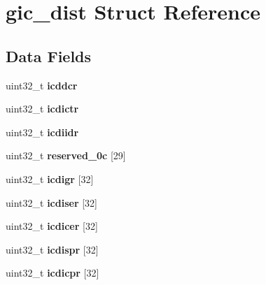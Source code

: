 \hypertarget{structgic__dist}{}\section{gic\+\_\+dist Struct Reference}
\label{structgic__dist}
\subsection*{Data Fields}
\begin{DoxyCompactItemize}
\item 
\mbox{\label{structgic__dist_acb869ca90c086871cbdedb86af8e6c33}} 
uint32\+\_\+t {\bfseries icddcr}
\item 
\mbox{\label{structgic__dist_aafbd2067aaa487d5c2d7db95680bd8d3}} 
uint32\+\_\+t {\bfseries icdictr}
\item 
\mbox{\label{structgic__dist_a22ebc84cf4b8ed04eecafeba3bb64900}} 
uint32\+\_\+t {\bfseries icdiidr}
\item 
\mbox{\label{structgic__dist_afa932d26fc72f80b8e236525715565db}} 
uint32\+\_\+t {\bfseries reserved\+\_\+0c} \mbox{[}29\mbox{]}
\item 
\mbox{\label{structgic__dist_a7f4add34b8d2a701b8be233cbb3faba7}} 
uint32\+\_\+t {\bfseries icdigr} \mbox{[}32\mbox{]}
\item 
\mbox{\label{structgic__dist_a4f21f620acade3431a193d62dcd3e864}} 
uint32\+\_\+t {\bfseries icdiser} \mbox{[}32\mbox{]}
\item 
\mbox{\label{structgic__dist_a2e7450117de1d3027266c565f7eacdc1}} 
uint32\+\_\+t {\bfseries icdicer} \mbox{[}32\mbox{]}
\item 
\mbox{\label{structgic__dist_a5c5892ba2ffb043e74d95d112291fa34}} 
uint32\+\_\+t {\bfseries icdispr} \mbox{[}32\mbox{]}
\item 
\mbox{\label{structgic__dist_ad5c47bd4dceca4da6fffe09e7588d245}} 
uint32\+\_\+t {\bfseries icdicpr} \mbox{[}32\mbox{]}
\item 
\mbox{\label{structgic__dist_a4adc83eee02c68a844570a2e82569473}} 

\end{DoxyCompactItemize}
